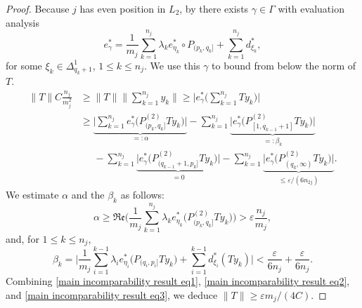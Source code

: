 \documentclass[11pt]{amsart}
\theoremstyle{definition}
\newcommand{\e}{\varepsilon}
\numberwithin{equation}{section}
\begin{document}
\begin{proof}
Because $j$ has even position in $L_2$, by  there exists $\gamma\in\Gamma$ with evaluation analysis
\[e_\gamma^* = \frac{1}{m_j}\sum_{k=1}^{n_j}\lambda_ke_{\eta_k}^*\circ P_{(p_k,q_k]} + \sum_{k=1}^{n_j}d_{\xi_k}^*,\]
for some $\xi_k\in\Delta_{q_k+1}^1$, $1\leq k\leq n_j$. We use this $\gamma$ to bound from below the norm of $T$.
\begin{equation}\label{main incomparability result eq1}
\begin{split}
    \|T\|C\frac{n_{j}}{m^2_{j}} &\geq \|T\|\Big\|\sum_{k=1}^{n_{j}}y_k\Big\|  \geq \Big|e_\gamma^*\Big(\sum_{k=1}^{n_{j}}Ty_k\Big)\Big|\\
&\geq \underbrace{\Big|\sum_{k=1}^{n_{j}}e_\gamma^*\Big(P^{(2)}_{(p_k,q_k]}Ty_k\Big)\Big|}_{=:\alpha} - \sum_{k=1}^{n_{j}}\underbrace{\Big|e_\gamma^*\Big(P^{(2)}_{[1,q_{k-1}+1]}Ty_k\Big)\Big|}_{=:\beta_k}\\
&\phantom{geq}- \sum_{k=1}^{n_{j}}\underbrace{\Big|e_\gamma^*\Big(P^{(2)}_{(q_{k-1}+1,p_k]}Ty_k\Big)\Big|}_{=0} - \sum_{k=1}^{n_{j}}\underbrace{\Big|e_\gamma^*\Big(P^{(2)}_{(q_k,\infty)}Ty_k\Big)\Big|}_{\leq \e/(6n_{2j})}.
\end{split}
\end{equation}
We estimate $\alpha$ and the $\beta_k$ as follows:
\begin{equation}
\label{main incomparability result eq2}
\alpha \geq \mathfrak{Re}\Big(\frac{1}{m_{j}}\sum_{k=1}^{n_{j}}\lambda_ke_{\eta_k}^*\big(P^{(2)}_{(p_k,q_k]}Ty_k)\Big) > \e\frac{n_{j}}{m_{j}},
\end{equation}
and, for $1\leq k\leq n_{j}$,
\begin{equation}
\label{main incomparability result eq3}
    \beta_k =\Big|\frac{1}{m_{j}}\sum_{i=1}^{k-1}\lambda_ie_{\eta_i}^*\Big(P_{(q_i,p_i]}Ty_k\Big) + \sum_{i=1}^{k-1}d_{\xi_i}^*(Ty_k)\Big| < \frac{\e}{6n_{j}} + \frac{\e}{6n_{j}}.
\end{equation}
Combining \eqref{main incomparability result eq1}, \eqref{main incomparability result eq2}, and \eqref{main incomparability result eq3}, we deduce $\|T\| \geq \e m_j/(4C)$.
\end{proof}
\end{document}
